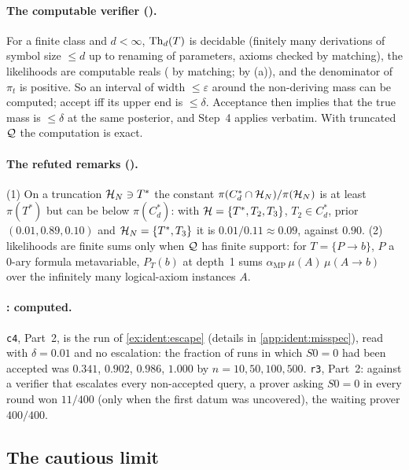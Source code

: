 \paragraph{The computable verifier ().} For a finite class and $d<\infty$, $\mathrm{Th}_d(T)$ is decidable (finitely many derivations of symbol size $\le d$ up to renaming of parameters, axioms checked by matching), the likelihoods are computable reals (\Lzero{} by matching; \Lone{} by (a)), and the denominator of $\pi_t$ is positive. So an interval of width $\le\varepsilon$ around the non-deriving mass can be computed; accept iff its upper end is $\le\delta$. Acceptance then implies that the true mass is $\le\delta$ at the same posterior, and Step~4 applies verbatim. With truncated $\mathcal{Q}$ the computation is exact.

\paragraph{The refuted remarks ().} (1) On a truncation $\mathcal{H}_N\ni T^*$ the constant $\pi(C^*_d\cap\mathcal{H}_N)/\pi(\mathcal{H}_N)$ is at least $\pi(T^*)$ but can be below $\pi(C^*_d)$: with $\mathcal{H}=\{T^*,T_2,T_3\}$, $T_2\in C^*_d$, prior $(0.01,0.89,0.10)$ and $\mathcal{H}_N=\{T^*,T_3\}$ it is $0.01/0.11\approx0.09$, against $0.90$. (2) \Ltwo{} likelihoods are finite sums only when $\mathcal{Q}$ has finite support: for $T=\{P\to b\}$, $P$ a $0$-ary formula metavariable, $P_T(b)$ at depth~1 sums $\alpha_{\mathrm{MP}}\,\mu(A)\,\mu(A\to b)$ over the infinitely many logical-axiom instances $A$.

\paragraph{: computed.} \texttt{c4}, Part~2, is the run of \cref{ex:ident:escape} (details in \cref{app:ident:misspec}), read with $\delta=0.01$ and no escalation: the fraction of runs in which $S0=0$ had been accepted was $0.341$, $0.902$, $0.986$, $1.000$ by $n=10,50,100,500$. \texttt{r3}, Part~2: against a verifier that escalates every non-accepted query, a prover asking $S0=0$ in every round won $11/400$ (only when the first datum was uncovered), the waiting prover $400/400$.

\subsection{The cautious limit}\label{app:sound:cautious}

